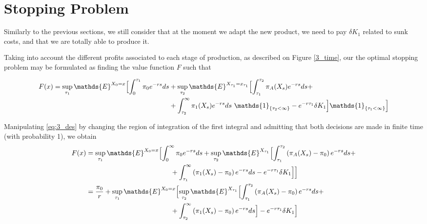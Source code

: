 \section{Stopping Problem}
\label{section:2_theory}



Similarly to the previous sections, we still consider that at the moment we adapt the new product, we need to pay $\delta K_1$ related to sunk costs, and that we are totally able to produce it. 

Taking into account the different profits associated to each stage of production, as described on Figure \ref{3_time}, our the optimal stopping problem may be formulated as finding the value function $F$ such that

\begin{align}
F(x)=\sup _{\tau_1} \mathds{E}^{X_0=x} \Bigl[ \int_0^{\tau_1} \pi_0e^{-rs} ds &+ \sup_{\tau_2} \mathds{E}^{X_{\tau_1}=x_{\tau_1}} \Bigl[ \int_{\tau_1}^{\tau_2}  \pi_A(X_s) e^{-rs}ds + \nonumber \\
& +\int_{\tau_2}^\infty \pi_1(X_s)e^{-rs}ds \ \mathds{1}_{ \{\tau_2<\infty \} } -e^{-r \tau_1}\delta K_1  \Bigr] \mathds{1}_{ \{\tau_1<\infty \} } \Bigr]
\label{eq:3_des}
\end{align}


Manipulating \eqref{eq:3_des} by changing the region of integration of the first integral and admitting that both decisions are made in finite time (with probability 1), we obtain
\begin{align}
F(x)&=\sup _{\tau_1} \mathds{E}^{X_0=x} \Bigl[ \int_0^{\infty} \pi_0e^{-rs} ds +\sup_{\tau_2} \mathds{E}^{X_{\tau_1}} \Bigl[ \int_{\tau_1}^{\tau_2} \left( \pi_A(X_s)-\pi_0 \right) e^{-rs}ds +  \nonumber \\
&\hspace{4.35cm} +\int_{\tau_1}^\infty \left( \pi_1(X_s)-\pi_0 \right) e^{-rs}ds -e^{-r \tau_1}\delta K_1  \Bigr] \Bigr] \nonumber  \\
&=\frac{\pi_0}{r}+\sup _{\tau_1} \mathds{E}^{X_0=x} \Bigl[  \sup_{\tau_2} \mathds{E}^{X_{\tau_1}} \Bigl[ \int_{\tau_1}^{\tau_2} \left( \pi_A(X_s)-\pi_0 \right) e^{-rs}ds +\\
&\hspace{4.35cm}+ \int_{\tau_2}^\infty \left( \pi_1(X_s)-\pi_0 \right) e^{-rs}ds  \Bigr] -e^{-r \tau_1}\delta K_1 \Bigr]  \nonumber
\label{eq:32} 
\end{align}

